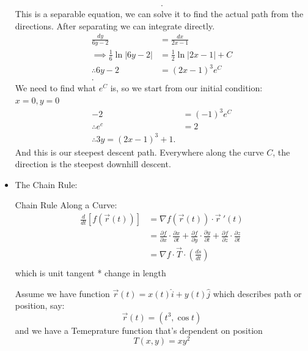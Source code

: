 \begin{itemize}
\begin{example}
\begin{align*}
		.\end{align*}
		This is a separable equation, we can solve it to find the actual path from the directions. After separating we can integrate directly.
		\begin{align*}
			\frac{dy}{6y-2}&= \frac{dx}{2x-1} \\
			\implies \frac{1}{6} \ln|6y-2| &=  \frac{1}{2}\ln|2x-1| + C \\
			\therefore 6y-2 &= \left( 2x-1 \right) ^3e^C \\
		.\end{align*}
		We need to find what $e^C$ is, so we start from our initial condition: $x=0, y=0$
		\begin{align*}
			-2 &= \left( -1 \right) ^3e^C \\
			\therefore e^c &= 2 \\
			\therefore 3y = \left( 2x-1 \right) ^3+1
		.\end{align*}
		And this is our steepest descent path. Everywhere along the curve $C$, the direction is the steepest downhill descent.
	\end{example}
\item The Chain Rule:
	\begin{theorem}
		Chain Rule Along a Curve:
		\begin{align*}
			\frac{d}{dt}\left[ f\left(\vec{r}\left( t \right)  \right)  \right] &= \nabla f\left( \vec{r}\left( t \right)  \right) \cdot \vec{r}~'\left( t \right) \\
			&= \frac{\partial f}{\partial x} \cdot \frac{\partial x}{\partial t} +\frac{\partial f}{\partial y} \cdot \frac{\partial y}{\partial t} +\frac{\partial f}{\partial z} \cdot \frac{\partial z}{\partial t}  \\
			&= \nabla f \cdot  \vec{T} \cdot \left( \frac{ds}{dt} \right)  \\
		\end{align*}
		which is unit tangent * change in length
	\end{theorem}
	\begin{example}
		Assume we have function $\vec{r}\left( t \right)  = x\left( t \right) \hat{i} + y\left( t \right) \hat{j}$ which describes path or position, say:
		\begin{equation}
			\vec{r}\left( t \right)  = \left( t^3, \cos t \right) 
		\end{equation}
		and we have a Temeprature function that's dependent on position
		\begin{equation}
			T\left( x,y \right)  = xy^2
		\end{equation}

\end{example}
\end{itemize}
